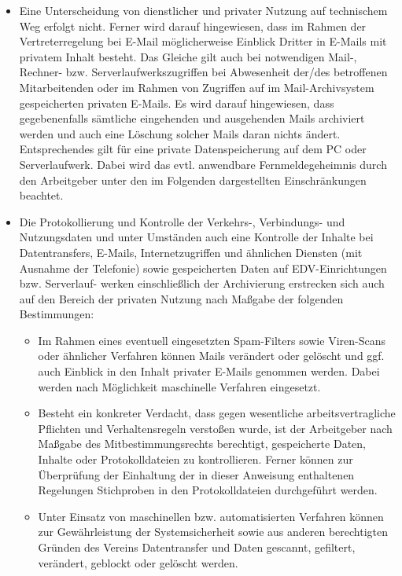 \documentclass[a4paper, fontsize=11pt]{scrartcl}
\begin{document}
\begin{itemize}
  \item Eine Unterscheidung von dienstlicher und privater Nutzung auf technischem Weg erfolgt nicht. Ferner wird darauf hingewiesen, dass im Rahmen der Vertreterregelung bei E-Mail möglicherweise Einblick Dritter in E-Mails mit privatem Inhalt besteht. Das Gleiche gilt auch bei notwendigen Mail-, Rechner- bzw. Serverlaufwerkszugriffen bei Abwesenheit der/des betroffenen Mitarbeitenden oder im Rahmen von Zugriffen auf im Mail-Archivsystem gespeicherten privaten E-Mails. Es wird darauf hingewiesen, dass gegebenenfalls sämtliche eingehenden und ausgehenden Mails archiviert werden und auch eine Löschung solcher Mails daran nichts ändert. Entsprechendes gilt für eine private Datenspeicherung auf dem PC oder Serverlaufwerk. Dabei wird das evtl. anwendbare Fernmeldegeheimnis durch den Arbeitgeber unter den im Folgenden dargestellten Einschränkungen beachtet.
  \item Die Protokollierung und Kontrolle der Verkehrs-, Verbindungs- und Nutzungsdaten und unter Umständen auch eine Kontrolle der Inhalte bei Datentransfers, E-Mails, Internetzugriffen und ähnlichen Diensten (mit Ausnahme der Telefonie) sowie gespeicherten Daten auf EDV-Einrichtungen bzw. Serverlauf- werken einschließlich der Archivierung erstrecken sich auch auf den Bereich der privaten Nutzung nach Maßgabe der folgenden Bestimmungen:
  \begin{itemize}
    \item Im Rahmen eines eventuell eingesetzten Spam-Filters sowie Viren-Scans oder ähnlicher Verfahren können Mails verändert oder gelöscht und ggf. auch Einblick in den Inhalt privater E-Mails genommen werden. Dabei werden nach Möglichkeit maschinelle Verfahren eingesetzt.
    \item Besteht ein konkreter Verdacht, dass gegen wesentliche arbeitsvertragliche Pflichten und Verhaltensregeln verstoßen wurde, ist der Arbeitgeber nach Maßgabe des Mitbestimmungsrechts berechtigt, gespeicherte Daten, Inhalte oder Protokolldateien zu kontrollieren. Ferner können zur Überprüfung der Einhaltung der in dieser Anweisung enthaltenen Regelungen Stichproben in den Protokolldateien durchgeführt werden.
    \item Unter Einsatz von maschinellen bzw. automatisierten Verfahren können zur Gewährleistung der Systemsicherheit sowie aus anderen berechtigten Gründen des Vereins Datentransfer und Daten gescannt, gefiltert, verändert, geblockt oder gelöscht werden.
  \end{itemize}
\end{itemize}
\end{document}
